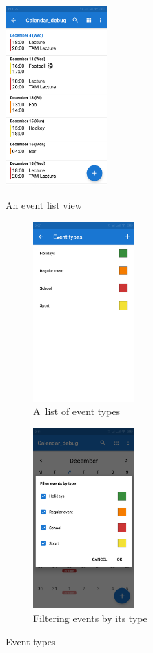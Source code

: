 \documentclass[a4paper, 11pt]{article}
\begin{document}
	\begin{figure}[ht]
		\centering

		\begin{minipage}{.45\textwidth}
			\centering
			\includegraphics[width=10.5em, frame]{img/calendar_event_list.png}
			\caption{An event list view}
			\label{fig:calendar-event-list}
		\end{minipage}
		\begin{minipage}{.53\textwidth}
			\centering

			\begin{subfigure}{.49 \textwidth}
				\centering
				\includegraphics[width=10.5em, frame]{img/event_types.png}
				\caption{A~list of event types}
			\end{subfigure}
			\begin{subfigure}{.49 \textwidth}
				\centering
				\includegraphics[width=10.5em, frame]{img/filter_events.png}
				\caption{Filtering events by its type}
			\end{subfigure}

			\caption{Event types}
			\label{fig:event-types}
		\end{minipage}
	\end{figure}
\end{document}
